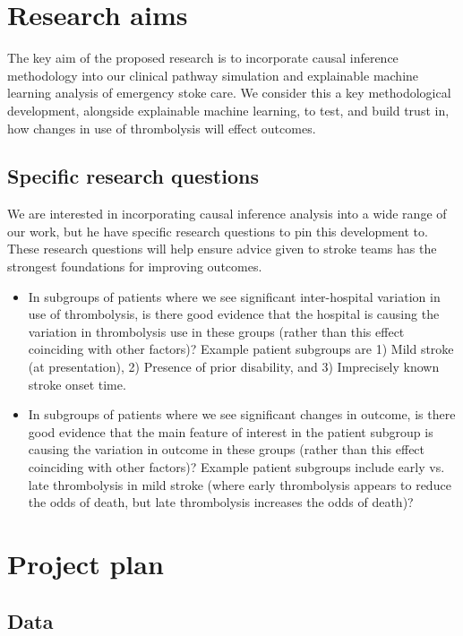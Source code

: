 \section{Research aims}

The key aim of the proposed research is to incorporate causal inference methodology into our clinical pathway simulation and explainable machine learning analysis of emergency stoke care. We consider this a key methodological development, alongside explainable machine learning, to test, and build trust in, how changes in use of thrombolysis will effect outcomes.

\subsection{Specific research questions}

We are interested in incorporating causal inference analysis into a wide range of our work, but he have specific research questions to pin this development to. These research questions will help ensure advice given to stroke teams has the strongest foundations for improving outcomes.

\begin{itemize}
    \item In subgroups of patients where we see significant inter-hospital variation in use of thrombolysis, is there good evidence that the hospital is causing the variation in thrombolysis use in these groups (rather than this effect coinciding with other factors)? Example patient subgroups are 1) Mild stroke (at presentation), 2) Presence of prior disability, and 3) Imprecisely known stroke onset time.

    \item In subgroups of patients where we see significant changes in outcome, is there good evidence that the main feature of interest in the patient subgroup is causing the variation in outcome in these groups (rather than this effect coinciding with other factors)? Example patient subgroups include early vs. late thrombolysis in mild stroke (where early thrombolysis appears to reduce the odds of death, but late thrombolysis increases the odds of death)?
\end{itemize}


\section{Project plan}

\subsection{Data}

